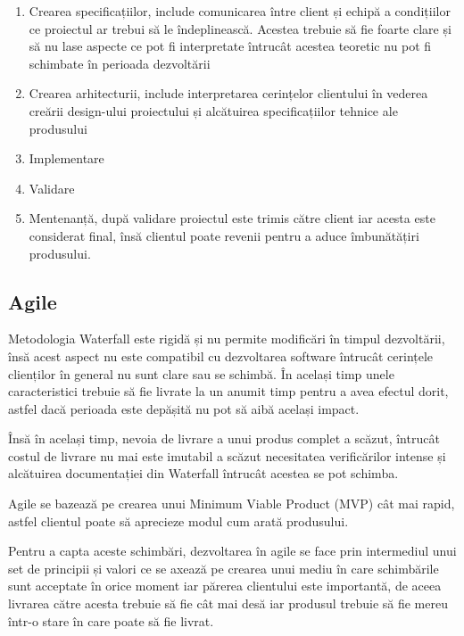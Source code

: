 \begin{enumerate}
    \item Crearea specificațiilor, include comunicarea între client și echipă
          a condițiilor ce proiectul ar trebui să le îndeplinească. Acestea trebuie să
          fie foarte clare și să nu lase aspecte ce pot fi interpretate întrucât
          acestea teoretic nu pot fi schimbate în perioada dezvoltării
    \item Crearea arhitecturii, include interpretarea cerințelor clientului
          în vederea creării design-ului proiectului și alcătuirea specificațiilor tehnice ale
          produsului
    \item Implementare
    \item Validare
    \item Mentenanță, după validare proiectul este trimis către client iar acesta
          este considerat final, însă clientul poate revenii pentru a aduce îmbunătățiri
          produsului.
\end{enumerate}

\subsection{Agile}

Metodologia Waterfall este rigidă și nu permite modificări în timpul dezvoltării,
însă acest aspect nu este compatibil cu dezvoltarea software întrucât cerințele
clienților în general nu sunt clare sau se schimbă. În același timp unele
caracteristici trebuie să fie livrate la un anumit timp pentru a avea efectul dorit,
astfel dacă perioada este depășită nu pot să aibă același impact.

Însă în același timp, nevoia de livrare a unui produs complet a scăzut,
întrucât costul de livrare nu mai este imutabil a scăzut necesitatea
verificărilor intense și alcătuirea documentației din Waterfall întrucât
acestea se pot schimba.

Agile se bazează pe crearea unui Minimum Viable Product (MVP) cât mai rapid,
astfel clientul poate să aprecieze modul cum arată produsului.

Pentru a capta aceste schimbări, dezvoltarea în agile se face prin intermediul
unui set de principii și valori ce se axează pe crearea unui mediu în care schimbările
sunt acceptate în orice moment iar părerea clientului este importantă, de aceea
livrarea către acesta trebuie să fie cât mai desă iar produsul trebuie să fie
mereu într-o stare în care poate să fie livrat.

